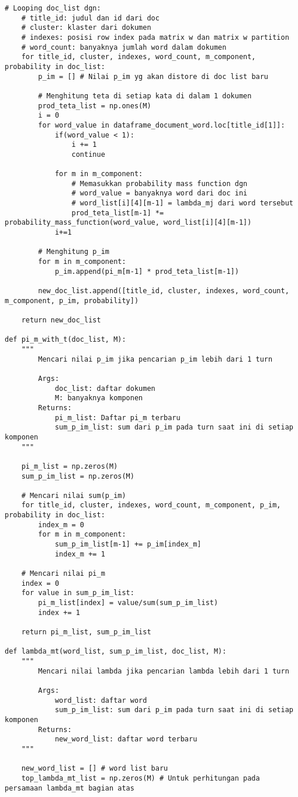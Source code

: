 \begin{lstlisting}[breaklines=true]
	# Looping doc_list dgn:
	# title_id: judul dan id dari doc
	# cluster: klaster dari dokumen
	# indexes: posisi row index pada matrix w dan matrix w partition
	# word_count: banyaknya jumlah word dalam dokumen
	for title_id, cluster, indexes, word_count, m_component, probability in doc_list:
		p_im = [] # Nilai p_im yg akan distore di doc list baru
		
		# Menghitung teta di setiap kata di dalam 1 dokumen
		prod_teta_list = np.ones(M)
		i = 0
		for word_value in dataframe_document_word.loc[title_id[1]]:
			if(word_value < 1):
				i += 1
				continue
			
			for m in m_component:
				# Memasukkan probability mass function dgn
				# word_value = banyaknya word dari doc ini
				# word_list[i][4][m-1] = lambda_mj dari word tersebut
				prod_teta_list[m-1] *= probability_mass_function(word_value, word_list[i][4][m-1])
			i+=1
		
		# Menghitung p_im
		for m in m_component:
			p_im.append(pi_m[m-1] * prod_teta_list[m-1])
				
		new_doc_list.append([title_id, cluster, indexes, word_count, m_component, p_im, probability])
			
	return new_doc_list

def pi_m_with_t(doc_list, M):
	"""
		Mencari nilai p_im jika pencarian p_im lebih dari 1 turn

		Args:
			doc_list: daftar dokumen
			M: banyaknya komponen
		Returns:
			pi_m_list: Daftar pi_m terbaru
			sum_p_im_list: sum dari p_im pada turn saat ini di setiap komponen
	"""
	
	pi_m_list = np.zeros(M)
	sum_p_im_list = np.zeros(M)

	# Mencari nilai sum(p_im)
	for title_id, cluster, indexes, word_count, m_component, p_im, probability in doc_list:
		index_m = 0
		for m in m_component:
			sum_p_im_list[m-1] += p_im[index_m]
			index_m += 1
	
	# Mencari nilai pi_m
	index = 0
	for value in sum_p_im_list:
		pi_m_list[index] = value/sum(sum_p_im_list)
		index += 1

	return pi_m_list, sum_p_im_list

def lambda_mt(word_list, sum_p_im_list, doc_list, M):
	"""
		Mencari nilai lambda jika pencarian lambda lebih dari 1 turn

		Args:
			word_list: daftar word
			sum_p_im_list: sum dari p_im pada turn saat ini di setiap komponen
		Returns:
			new_word_list: daftar word terbaru
	"""
	
	new_word_list = [] # word list baru
	top_lambda_mt_list = np.zeros(M) # Untuk perhitungan pada persamaan lambda_mt bagian atas 
	

\end{lstlisting}

